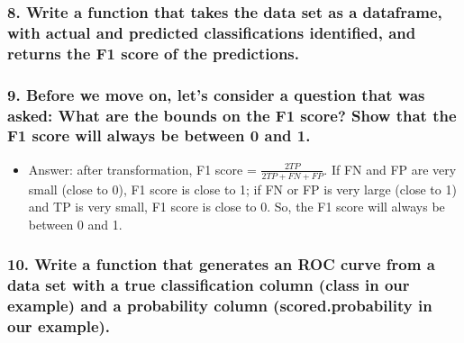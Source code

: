 \documentclass[]{article}
\newenvironment{Shaded}{\begin{snugshade}}{\end{snugshade}}
\newcommand{\KeywordTok}[1]{\textcolor[rgb]{0.13,0.29,0.53}{\textbf{{#1}}}}
\newcommand{\DecValTok}[1]{\textcolor[rgb]{0.00,0.00,0.81}{{#1}}}
\newcommand{\StringTok}[1]{\textcolor[rgb]{0.31,0.60,0.02}{{#1}}}
\newcommand{\NormalTok}[1]{{#1}}
\providecommand{\tightlist}{%
  \setlength{\itemsep}{0pt}\setlength{\parskip}{0pt}}
\begin{document}
\subsubsection{8. Write a function that takes the data set as a
dataframe, with actual and predicted classifications identified, and
returns the F1 score of the
predictions.}\label{write-a-function-that-takes-the-data-set-as-a-dataframe-with-actual-and-predicted-classifications-identified-and-returns-the-f1-score-of-the-predictions.}

\begin{Shaded}
\end{Shaded}

\subsubsection{9. Before we move on, let's consider a question that was
asked: What are the bounds on the F1 score? Show that the F1 score will
always be between 0 and
1.}\label{before-we-move-on-lets-consider-a-question-that-was-asked-what-are-the-bounds-on-the-f1-score-show-that-the-f1-score-will-always-be-between-0-and-1.}

\begin{itemize}
\tightlist
\item
  Answer: after transformation, F1 score =
  \(\frac { 2TP }{ 2TP+FN+FP }\). If FN and FP are very small (close to
  0), F1 score is close to 1; if FN or FP is very large (close to 1) and
  TP is very small, F1 score is close to 0. So, the F1 score will always
  be between 0 and 1.
\end{itemize}

\subsubsection{10. Write a function that generates an ROC curve from a
data set with a true classification column (class in our example) and a
probability column (scored.probability in our
example).}\label{write-a-function-that-generates-an-roc-curve-from-a-data-set-with-a-true-classification-column-class-in-our-example-and-a-probability-column-scored.probability-in-our-example.}
\end{document}
